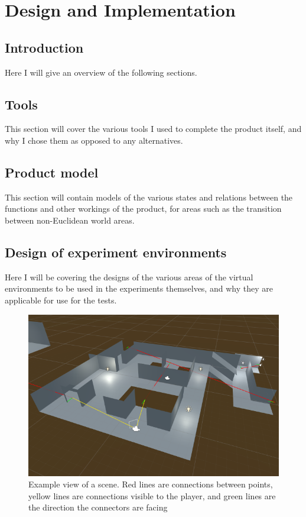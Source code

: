 \chapter[Product]{Design and Implementation}
\label{design}

\begin{multicols*}{2}

	\section{Introduction}
		Here I will give an overview of the following sections.

	\section{Tools}
		This section will cover the various tools I used to complete the product itself, and why I chose them as opposed to any alternatives.

	\section{Product model}
		This section will contain models of the various states and relations between the functions and other workings of the product, for areas such as the transition between non-Euclidean world areas.

	\section{Design of experiment environments}
		Here I will be covering the designs of the various areas of the virtual environments to be used in the experiments themselves, and why they are applicable for use for the tests.

\end{multicols*}

		\begin{figure}[h]
			\label{design:fig:scene}
			\includegraphics[width=1\textwidth]{Images/Lines_Everywhere2}
			\centering
			\caption{Example view of a scene.
				Red lines are connections between points,
				yellow lines are connections visible to the player,
				and green lines are the direction the connectors are facing}
		\end{figure}


